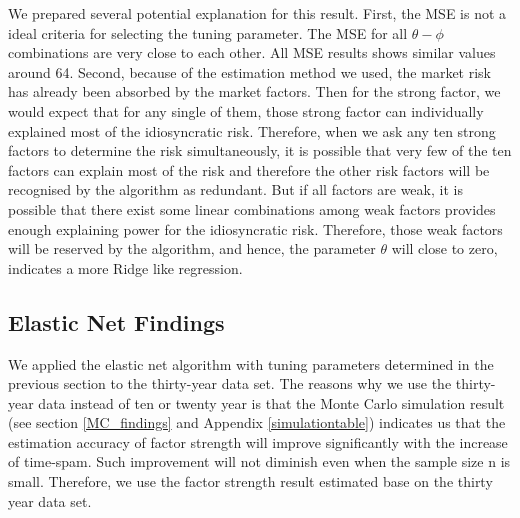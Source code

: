 We prepared several potential explanation for this result.
First, the MSE is not a ideal criteria for selecting the tuning parameter.
The MSE for all $\theta - \phi$ combinations are very close to each other.
All MSE results shows similar values around 64.
Second, because of the estimation method we used, the market risk has already been absorbed by the market factors.
Then for the strong factor, we would expect that for any single of them, those strong factor can individually explained most of the idiosyncratic risk.
Therefore, when we ask any ten strong factors to determine the risk simultaneously, it is possible that very few of the ten factors can explain most of the risk and therefore the other risk factors will be recognised by the algorithm as redundant.
But if all factors are weak, it is possible that there exist some linear combinations among weak factors provides enough explaining power for the idiosyncratic risk.
Therefore, those weak factors will be reserved by the algorithm, and hence, the parameter $\theta$ will close to zero, indicates a more Ridge like regression.





\subsection{Elastic Net Findings}
We applied the elastic net algorithm with tuning parameters determined in the previous section to the thirty-year data set.
The reasons why we use the thirty-year data instead of ten or twenty year is that the Monte Carlo simulation result (see section \ref{MC_findings} and Appendix \ref{simulationtable}) indicates us that the estimation accuracy of factor strength will improve significantly with the increase of time-spam.
Such improvement will not diminish even when the sample size n is small.
Therefore, we use the factor strength result estimated base on the thirty year data set.

